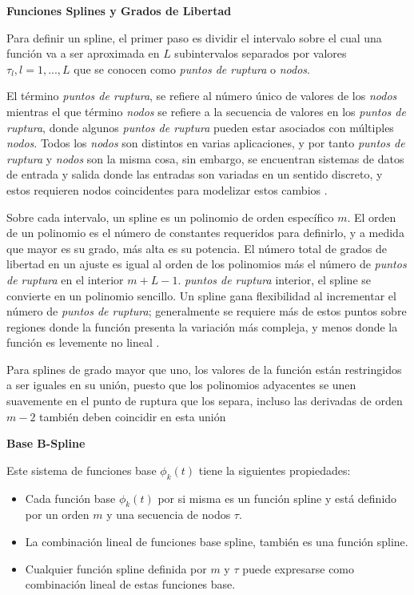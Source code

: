 \documentclass[
]{book}
\begin{document}
\textbf{Funciones Splines y Grados de Libertad}

Para definir un spline, el primer paso es dividir el intervalo sobre el cual una función va a ser aproximada en \(L\) subintervalos separados por valores \(\tau_l, l=1,...,L\) que se conocen como \emph{puntos de ruptura} o \emph{nodos}.

El término \emph{puntos de ruptura}, se refiere al número único de valores de los \emph{nodos} mientras el que término \emph{nodos} se refiere a la secuencia de valores en los \emph{puntos de ruptura}, donde algunos \emph{puntos de ruptura} pueden estar asociados con múltiples \emph{nodos}. Todos los \emph{nodos} son distintos en varias aplicaciones, y por tanto \emph{puntos de ruptura} y \emph{nodos} son la misma cosa, sin embargo, se encuentran sistemas de datos de entrada y salida donde las entradas son variadas en un sentido discreto, y estos requieren nodos coincidentes para modelizar estos cambios \citep{ramsay}.

Sobre cada intervalo, un spline es un polinomio de orden específico \(m\). El orden de un polinomio es el número de constantes requeridos para definirlo, y a medida que mayor es su grado, más alta es su potencia. El número total de grados de libertad en un ajuste es igual al orden de los polinomios más el número de \emph{puntos de ruptura} en el interior \(m+L-1\). \emph{puntos de ruptura} interior, el spline se convierte en un polinomio sencillo. Un spline gana flexibilidad al incrementar el número de \emph{puntos de ruptura}; generalmente se requiere más de estos puntos sobre regiones donde la función presenta la variación más compleja, y menos donde la función es levemente no lineal \citep{ramsay}.

Para splines de grado mayor que uno, los valores de la función están restringidos a ser iguales en su unión, puesto que los polinomios adyacentes se unen suavemente en el punto de ruptura que los separa, incluso las derivadas de orden \(m-2\) también deben coincidir en esta unión \citep{ramsay}

\textbf{Base B-Spline}

Este sistema de funciones base \(\phi_k(t)\) tiene la siguientes propiedades:

\begin{itemize}
\item
  Cada función base \(\phi_k(t)\) por si misma es un función spline y está definido por un orden \(m\) y una secuencia de nodos \(\tau\).
\item
  La combinación lineal de funciones base spline, también es una función spline.
\item
  Cualquier función spline definida por \(m\) y \(\tau\) puede expresarse como combinación lineal de estas funciones base.
\end{itemize}
\end{document}

